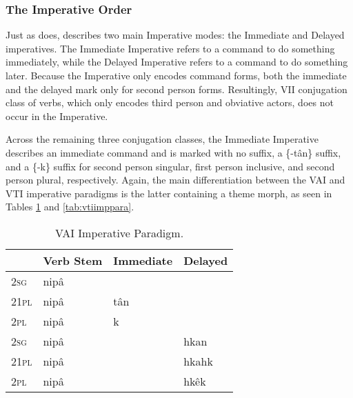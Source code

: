 \subsubsection{The Imperative Order}


Just as \citet{Bloomfield1946} does, \citet{Wolfart1973} describes two main Imperative modes: the Immediate and Delayed imperatives. The Immediate Imperative refers to a command to do something immediately, while the Delayed Imperative refers to a command to do something later. Because the Imperative only encodes command forms, both the immediate and the delayed mark only for second person forms. Resultingly, VII conjugation class of verbs, which only encodes third person and obviative actors, does not occur in the Imperative.

Across the remaining three conjugation classes, the Immediate Imperative describes an immediate command and is marked with no suffix, a \{-tân\} suffix, and a \{-k\} suffix for second person singular, first person inclusive, and second person plural, respectively.
Again, the main differentiation between the VAI and VTI imperative paradigms is the latter containing a theme morph, as seen in Tables \ref{tab:vaiimppara} and \ref{tab:vtiimppara}.

\begin{table}[h]
  \centering
  \begin{tabular}{llll}
    \toprule
              &       Verb Stem                         & Immediate & Delayed \\
    \midrule
2\textsc{sg}  &      nipâ                          &           &         \\
21\textsc{pl} &      nipâ                          & tân       &         \\
2\textsc{pl}  &     nipâ                           & k         &         \\
\hline
\hline
2\textsc{sg}  &     nipâ                           &           & hkan    \\
21\textsc{pl} &     nipâ                           &           & hkahk   \\
2\textsc{pl}  &     nipâ                           &           & hkêk    \\
    \bottomrule
  \end{tabular}
  \caption{
    VAI Imperative Paradigm. \citep[395]{Wolvengrey2011} \label{tab:vaiimppara}
  }
\end{table}

